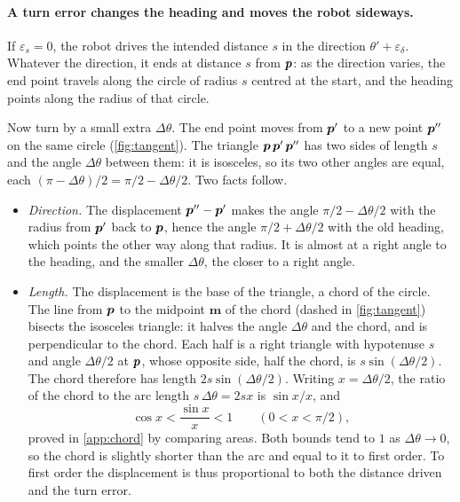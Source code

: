 \paragraph{A turn error changes the heading and moves the robot sideways.}
If $\varepsilon_s=0$, the robot drives the intended distance $s$ in the
direction $\theta'+\varepsilon_\delta$. Whatever the direction, it ends at
distance $s$ from $\bm{p}$: as the direction varies, the end point travels
along the circle of radius $s$ centred at the start, and the heading points
along the radius of that circle.

Now turn by a small extra $\Delta\theta$. The end point moves from $\bm{p}'$
to a new point $\bm{p}''$ on the same circle (\cref{fig:tangent}). The triangle $\bm{p}\,\bm{p}'\,\bm{p}''$ has two
sides of length $s$ and the angle $\Delta\theta$ between them: it is
isosceles, so its two other angles are equal, each
$(\pi-\Delta\theta)/2=\pi/2-\Delta\theta/2$. Two facts follow.
\begin{itemize}
  \item \emph{Direction.} The displacement $\bm{p}''-\bm{p}'$ makes the angle
    $\pi/2-\Delta\theta/2$ with the radius from $\bm{p}'$ back to $\bm{p}$, hence
    the angle $\pi/2+\Delta\theta/2$ with the old heading, which points the
    other way along that radius. It is almost at a right angle to the
    heading, and the smaller $\Delta\theta$, the closer to a right angle.
  \item \emph{Length.} The displacement is the base of the triangle, a chord
    of the circle. The line from $\bm{p}$ to the midpoint $\bm{m}$ of the chord
    (dashed in \cref{fig:tangent}) bisects the isosceles triangle: it halves
    the angle $\Delta\theta$ and the chord, and is perpendicular to the
    chord. Each half is a right triangle with hypotenuse $s$ and angle
    $\Delta\theta/2$ at $\bm{p}$, whose opposite side, half the chord, is
    $s\sin(\Delta\theta/2)$. The chord therefore has length
    $2s\sin(\Delta\theta/2)$. Writing $x=\Delta\theta/2$, the ratio of the
    chord to the arc length $s\,\Delta\theta=2sx$ is $\sin x/x$, and
    \begin{equation}\label{eq:sinx}
      \cos x<\frac{\sin x}{x}<1\qquad(0<x<\pi/2),
    \end{equation}
    proved in \cref{app:chord} by comparing areas. Both bounds tend to $1$ as
    $\Delta\theta\to0$, so the chord is slightly shorter than the arc and
    equal to it to first order. To first order the displacement is thus
    proportional to both the distance driven and the turn error.
\end{itemize}

